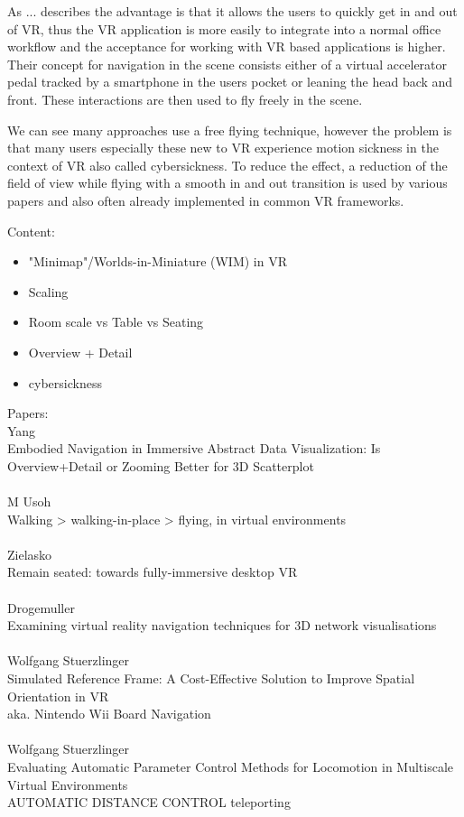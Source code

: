  As ... describes the advantage is that it allows the users to quickly get in and out of VR, thus the VR application is more easily to integrate into a normal office workflow and the acceptance for working with VR based applications is higher. Their concept for navigation in the scene consists either of a virtual accelerator pedal tracked by a smartphone in the users pocket or leaning the head back and front. These interactions are then used to fly freely in the scene.

We can see many approaches use a free flying technique, however the problem is that many users especially these new to VR experience motion sickness in the context of VR also called cybersickness.
To reduce the effect, a reduction of the field of view while flying with a smooth in and out transition is used by various papers and also often already implemented in common VR frameworks.



Content:
\begin{itemize}
    \item "Minimap"/Worlds-in-Miniature (WIM) in VR
    \item Scaling
    \item Room scale vs Table vs Seating
    \item Overview + Detail 
    \item cybersickness
\end{itemize}
Papers: \\
Yang\\
Embodied Navigation in Immersive Abstract Data Visualization:
Is Overview+Detail or Zooming Better for 3D Scatterplot\\
\\
M Usoh\\
Walking > walking-in-place > flying, in virtual environments\\
\\
Zielasko\\
Remain seated: towards fully-immersive desktop VR\\
\\
Drogemuller\\
Examining virtual reality navigation techniques for 3D network visualisations\\
\\
Wolfgang Stuerzlinger\\
Simulated Reference Frame: A Cost-Effective Solution to Improve Spatial Orientation in VR\\
aka. Nintendo Wii Board Navigation\\
\\
Wolfgang Stuerzlinger\\
Evaluating Automatic Parameter Control Methods for Locomotion in Multiscale Virtual Environments\\
AUTOMATIC DISTANCE CONTROL teleporting\\

